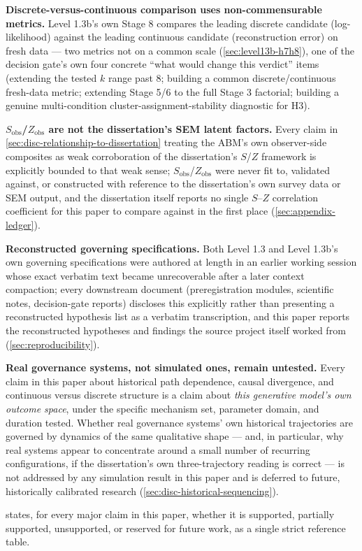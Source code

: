\textbf{Discrete-versus-continuous comparison uses non-commensurable
metrics.} Level 1.3b's own Stage 8 compares the leading discrete candidate
(log-likelihood) against the leading continuous candidate (reconstruction
error) on fresh data --- two metrics not on a common scale
(\cref{sec:level13b-h7h8}), one of the decision gate's own four concrete
``what would change this verdict'' items (extending the tested $k$ range
past 8; building a common discrete/continuous fresh-data metric; extending
Stage 5/6 to the full Stage 3 factorial; building a genuine multi-condition
cluster-assignment-stability diagnostic for H3).

\textbf{$S_{\text{obs}}$/$Z_{\text{obs}}$ are not the dissertation's SEM
latent factors.} Every claim in \cref{sec:disc-relationship-to-dissertation}
treating the ABM's own observer-side composites as weak corroboration of
the dissertation's $S$/$Z$ framework is explicitly bounded to that weak
sense; $S_{\text{obs}}$/$Z_{\text{obs}}$ were never fit to, validated
against, or constructed with reference to the dissertation's own survey
data or SEM output, and the dissertation itself reports no single $S$--$Z$
correlation coefficient for this paper to compare against in the first
place (\cref{sec:appendix-ledger}).

\textbf{Reconstructed governing specifications.} Both Level 1.3 and Level
1.3b's own governing specifications were authored at length in an earlier
working session whose exact verbatim text became unrecoverable after a
later context compaction; every downstream document (preregistration
modules, scientific notes, decision-gate reports) discloses this
explicitly rather than presenting a reconstructed hypothesis list as a
verbatim transcription, and this paper reports the reconstructed
hypotheses and findings the source project itself worked from
(\cref{sec:reproducibility}).

\textbf{Real governance systems, not simulated ones, remain untested.}
Every claim in this paper about historical path dependence, causal
divergence, and continuous versus discrete structure is a claim about
\textit{this generative model's own outcome space}, under the specific
mechanism set, parameter domain, and duration tested. Whether real
governance systems' own historical trajectories are governed by dynamics
of the same qualitative shape --- and, in particular, why real systems
appear to concentrate around a small number of recurring configurations,
if the dissertation's own three-trajectory reading is correct --- is not
addressed by any simulation result in this paper and is deferred to
future, historically calibrated research (\cref{sec:disc-historical-sequencing}).

 states, for every major claim in this
paper, whether it is supported, partially supported, unsupported, or
reserved for future work, as a single strict reference table.

\begin{table}[htbp]
\centering
\caption{Strict conclusion-boundary table: every major claim in this
paper, classified by evidentiary status.}
\label{tab:conclusion-boundary}
\end{table}
